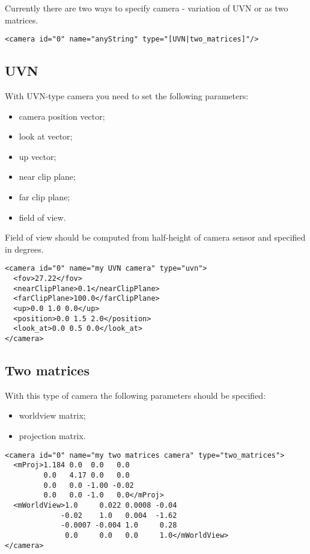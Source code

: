 \documentclass[a4paper,11pt]{report}
\begin{document}
Currently there are two ways to specify camera - variation of UVN or as two matrices.

\begin{lstlisting}
<camera id="0" name="anyString" type="[UVN|two_matrices]"/>
\end{lstlisting}

\subsection{UVN}
With UVN-type camera you need to set the following parameters:
\begin{itemize}
\item camera position vector;
\item look at vector;
\item up vector;
\item near clip plane;
\item far clip plane;
\item field of view.
\end{itemize}

Field of view should be computed from half-height of camera sensor and specified in degrees.
 
\lstset{language=XML}
\begin{lstlisting}
<camera id="0" name="my UVN camera" type="uvn">
  <fov>27.22</fov>
  <nearClipPlane>0.1</nearClipPlane>
  <farClipPlane>100.0</farClipPlane>
  <up>0.0 1.0 0.0</up>
  <position>0.0 1.5 2.0</position>
  <look_at>0.0 0.5 0.0</look_at>
</camera>
\end{lstlisting}

\subsection{Two matrices}

With this type of camera the following parameters should be specified:
\begin{itemize}
\item worldview matrix;
\item projection matrix.
\end{itemize}

\lstset{language=XML}
\begin{lstlisting}
<camera id="0" name="my two matrices camera" type="two_matrices">
  <mProj>1.184 0.0  0.0   0.0
         0.0   4.17 0.0   0.0
         0.0   0.0 -1.00 -0.02
         0.0   0.0 -1.0   0.0</mProj>
  <mWorldView>1.0     0.022 0.0008 -0.04
             -0.02    1.0   0.004  -1.62
             -0.0007 -0.004 1.0     0.28
              0.0     0.0   0.0     1.0</mWorldView>
</camera>
\end{lstlisting}
\end{document}
